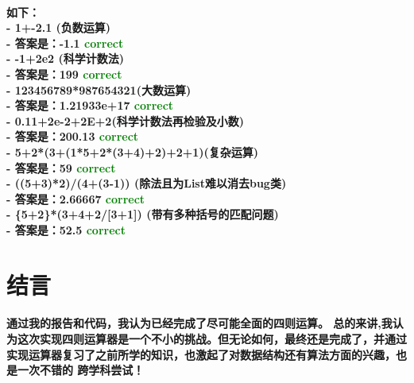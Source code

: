 \documentclass[UTF8]{ctexart}
\begin{document}
\paragraph{
如下：\\
- 1+-2.1 (负数运算)\\
- 答案是：-1.1 \textcolor{green}{correct}\\
- -1+2e2 (科学计数法)\\
- 答案是：199 \textcolor{green}{correct}\\
- 123456789*987654321(大数运算)\\
- 答案是：1.21933e+17 \textcolor{green}{correct}\\
- 0.11+2e-2+2E+2(科学计数法再检验及小数)\\
- 答案是：200.13 \textcolor{green}{correct}\\
- 5+2*(3+(1*5+2*(3+4)+2)+2+1)(复杂运算)\\
- 答案是：59 \textcolor{green}{correct}\\
- ((5+3)*2)/(4+(3-1)) (除法且为List难以消去bug类)\\
- 答案是：2.66667 \textcolor{green}{correct} \\
- \{5+2\}*(3+4+2/[3+1]) (带有多种括号的匹配问题)\\
- 答案是：52.5 \textcolor{green}{correct}
}
\section{结言}

\paragraph{\hspace{2em}
通过我的报告和代码，我认为已经完成了尽可能全面的四则运算。
总的来讲,我认为这次实现四则运算器是一个不小的挑战。但无论如何，最终还是完成了，并通过
实现运算器复习了之前所学的知识，也激起了对数据结构还有算法方面的兴趣，也是一次不错的
跨学科尝试！}
\end{document}
